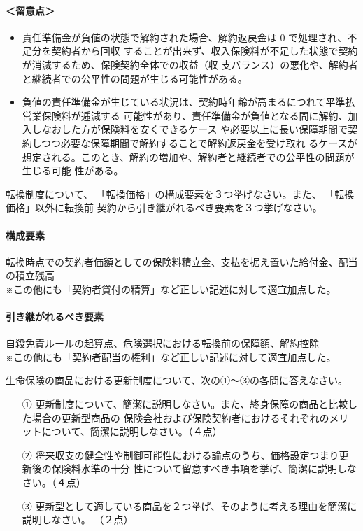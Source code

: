 \documentclass[report,gutter=10mm,fore-edge=10mm,uplatex,dvipdfmx]{jlreq}
\begin{document}
\paragraph{＜留意点＞}

\begin{itemize}
 \item 責任準備金が負値の状態で解約された場合、解約返戻金は 0 で処理され、不足分を契約者から回収 することが出来ず、収入保険料が不足した状態で契約が消滅するため、保険契約全体での収益（収 支バランス）の悪化や、解約者と継続者での公平性の問題が生じる可能性がある。
 \item 負値の責任準備金が生じている状況は、契約時年齢が高まるにつれて平準払営業保険料が逓減する 可能性があり、責任準備金が負値となる間に解約、加入しなおした方が保険料を安くできるケース
 や必要以上に長い保障期間で契約しつつ必要な保障期間で解約することで解約返戻金を受け取れ るケースが想定される。このとき、解約の増加や、解約者と継続者での公平性の問題が生じる可能
 性がある。
\end{itemize}

転換制度について、
「転換価格」の構成要素を３つ挙げなさい。また、
「転換価格」以外に転換前
契約から引き継がれるべき要素を３つ挙げなさい。

\paragraph{構成要素}
転換時点での契約者価額としての保険料積立金、支払を据え置いた給付金、配当の積立残高\\
※この他にも「契約者貸付の精算」など正しい記述に対して適宜加点した。
\paragraph{引き継がれるべき要素}
自殺免責ルールの起算点、危険選択における転換前の保障額、解約控除\\
※この他にも「契約者配当の権利」など正しい記述に対して適宜加点した。


生命保険の商品における更新制度について、次の①～③の各問に答えなさい。
\begin{enumerate}
 \item [①] 更新制度について、簡潔に説明しなさい。また、終身保障の商品と比較した場合の更新型商品の
 保険会社および保険契約者におけるそれぞれのメリットについて、簡潔に説明しなさい。（４点）
 \item [②] 将来収支の健全性や制御可能性における論点のうち、価格設定つまり更新後の保険料水準の十分
 性について留意すべき事項を挙げ、簡潔に説明しなさい。（４点）
 \item [③] 更新型として適している商品を２つ挙げ、そのように考える理由を簡潔に説明しなさい。 （２点）
\end{enumerate}
\end{document}
